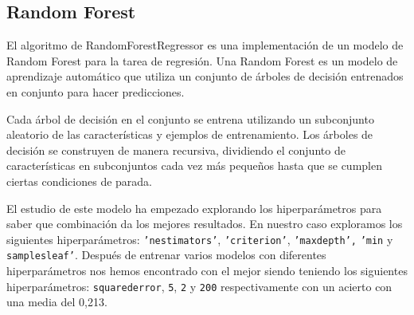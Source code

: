 \subsection{Random Forest}
El algoritmo de RandomForestRegressor es una implementación de un modelo de Random Forest para la tarea de regresión. Una Random Forest es un modelo de aprendizaje automático que utiliza un conjunto de árboles de decisión entrenados en conjunto para hacer predicciones.
\newline

Cada árbol de decisión en el conjunto se entrena utilizando un subconjunto aleatorio de las características y ejemplos de entrenamiento. Los árboles de decisión se construyen de manera recursiva, dividiendo el conjunto de características en subconjuntos cada vez más pequeños hasta que se cumplen ciertas condiciones de parada.
\newline

El estudio de este modelo ha empezado explorando los hiperparámetros para saber que combinación da los mejores resultados. En nuestro caso exploramos los siguientes hiperparámetros: \texttt{'n\textunderscore estimators'}, \texttt{'criterion'}, \texttt{'max\textunderscore depth',} \texttt{'min\textunderscore} y \texttt{samples\textunderscore leaf'}. Después de entrenar varios modelos con diferentes hiperparámetros nos hemos encontrado con el mejor siendo teniendo los siguientes hiperparámetros: \texttt{squared\textunderscore error}, \texttt{5}, \texttt{2} y \texttt{200} respectivamente con un acierto con una media del 0,213.